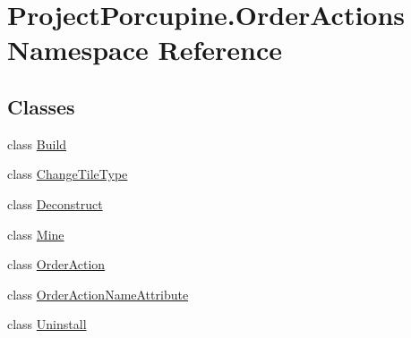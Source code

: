 \hypertarget{namespace_project_porcupine_1_1_order_actions}{}\section{Project\+Porcupine.\+Order\+Actions Namespace Reference}
\label{namespace_project_porcupine_1_1_order_actions}
\subsection*{Classes}
\begin{DoxyCompactItemize}
\item 
class \hyperlink{class_project_porcupine_1_1_order_actions_1_1_build}{Build}
\item 
class \hyperlink{class_project_porcupine_1_1_order_actions_1_1_change_tile_type}{Change\+Tile\+Type}
\item 
class \hyperlink{class_project_porcupine_1_1_order_actions_1_1_deconstruct}{Deconstruct}
\item 
class \hyperlink{class_project_porcupine_1_1_order_actions_1_1_mine}{Mine}
\item 
class \hyperlink{class_project_porcupine_1_1_order_actions_1_1_order_action}{Order\+Action}
\item 
class \hyperlink{class_project_porcupine_1_1_order_actions_1_1_order_action_name_attribute}{Order\+Action\+Name\+Attribute}
\item 
class \hyperlink{class_project_porcupine_1_1_order_actions_1_1_uninstall}{Uninstall}
\end{DoxyCompactItemize}
